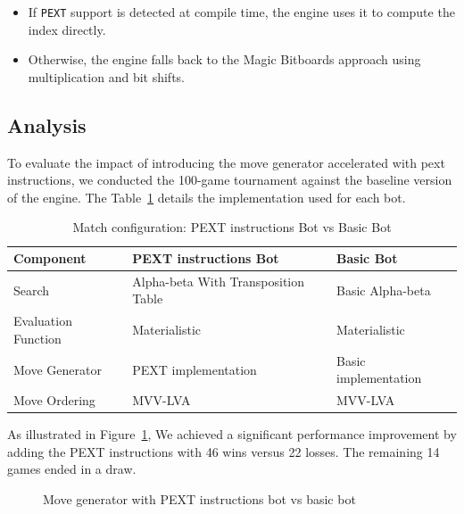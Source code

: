 \begin{itemize}
  \item If \texttt{PEXT} support is detected at compile time, the engine uses it to compute the index directly.
  \item Otherwise, the engine falls back to the Magic Bitboards approach using multiplication and bit shifts.
\end{itemize}

\subsection{Analysis}

\noindent To evaluate the impact of introducing the move generator accelerated with pext instructions, we conducted the 100-game tournament against the baseline version of the engine. The Table~\ref{tab:pext_vs_basic} details the implementation used for each bot.

\begin{table}[H]
    \centering
    \begin{tabular}{|p{4cm}|p{4cm}|p{4cm}|}
    \hline
    \textbf{Component}         & \textbf{PEXT instructions Bot}  & \textbf{Basic Bot}     \\ \hline
    Search                     & Alpha-beta With Transposition Table          & Basic Alpha-beta           \\ \hline
    Evaluation Function        & Materialistic                      & Materialistic       \\ \hline
    Move Generator             & PEXT implementation              & Basic implementation   \\ \hline
    Move Ordering              & MVV-LVA                           & MVV-LVA                \\ \hline
    \end{tabular}
    \caption{Match configuration: PEXT instructions Bot vs Basic Bot}
    \label{tab:pext_vs_basic}
\end{table}

\noindent As illustrated in Figure~\ref{fig:results_pext_move_generator_bot}, We achieved a significant performance improvement by adding the PEXT instructions with 46 wins versus 22 losses. The remaining 14 games ended in a draw.

\begin{center}
    \begin{figure}[H]
        \centering
        \caption{Move generator with PEXT instructions bot vs basic bot}
        \label{fig:results_pext_move_generator_bot}
    \end{figure}
\medskip
\end{center}

